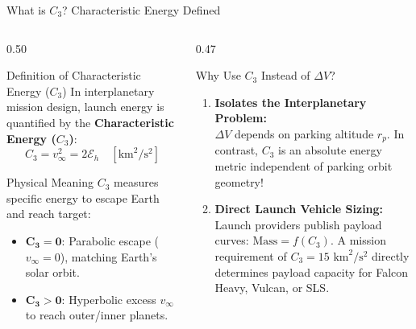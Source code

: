 \documentclass[aspectratio=169, 10pt]{beamer}
\begin{document}
\begin{frame}{What is $C_3$? Characteristic Energy Defined}
    \begin{columns}[t]
        \begin{column}{0.50\textwidth}
            \begin{block}{Definition of Characteristic Energy ($C_3$)}
                \scriptsize
                In interplanetary mission design, launch energy is quantified by the \textbf{Characteristic Energy ($C_3$)}:
                \vspace{-0.08cm}
                \begin{equation*}
                    C_3 = v_\infty^2 = 2 \mathcal{E}_h \quad [\text{km}^2/\text{s}^2]
                \end{equation*}
            \end{block}

            \begin{block}{Physical Meaning}
                \scriptsize
                $C_3$ measures specific energy to escape Earth and reach target:
                \begin{itemize}\setlength{\itemsep}{1.2pt}
                    \item $\mathbf{C_3 = 0}$: Parabolic escape ($v_\infty = 0$), matching Earth's solar orbit.
                    \item $\mathbf{C_3 > 0}$: Hyperbolic excess $v_\infty$ to reach outer/inner planets.
                \end{itemize}
            \end{block}
        \end{column}

        \begin{column}{0.47\textwidth}
            \begin{block}{Why Use $C_3$ Instead of $\Delta V$?}
                \scriptsize
                \begin{enumerate}\setlength{\itemsep}{2pt}
                    \item \textbf{Isolates the Interplanetary Problem:} \\
                    $\Delta V$ depends on parking altitude $r_p$. In contrast, $C_3$ is an absolute energy metric independent of parking orbit geometry!
                    \item \textbf{Direct Launch Vehicle Sizing:} \\
                    Launch providers publish payload curves: $\text{Mass} = f(C_3)$. A mission requirement of $C_3 = 15\text{ km}^2/\text{s}^2$ directly determines payload capacity for Falcon Heavy, Vulcan, or SLS.
                \end{enumerate}
            \end{block}
        \end{column}
    \end{columns}
\end{frame}
\end{document}
